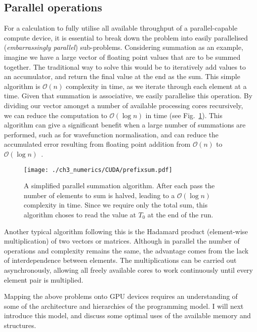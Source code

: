 \subsection{Parallel operations}\label{subsec:par_op}
\label{sub:Parallel operations}
For a calculation to fully utilise all available throughput of a parallel-capable
compute device, it is essential to break down the problem into easily parallelised (\textit{embarrassingly parallel}) sub-problems. Considering summation as an example, imagine we have a large vector of floating point values that are to be summed together. The traditional way to solve this would be to iteratively add values to an accumulator, and return the final value at the end as the sum. This simple algorithm is $\mathcal{O}(n)$ complexity in time, as we iterate through each element at a time. Given that summation is associative, we easily parallelise this operation. By dividing our vector amongst a number of available processing cores recursively, we can reduce the computation to $\mathcal{O}(\log{} n)$ in time (see Fig.~\ref{fig:prefixsum}). This algorithm can give a significant benefit when a large number of summations are performed, such as for wavefunction normalisation, and can reduce the accumulated error resulting from floating point addition from $\mathcal{O}(n)$ to $\mathcal{O}(\log{} n)$~\cite{NUM:Higham_siam_1993}.

\begin{figure}
    \centering
    \texttt{[image: ./ch3\_numerics/CUDA/prefixsum.pdf]}
    \caption{A simplified parallel summation algorithm. After each pass the number of elements to sum is halved, leading to a $\mathcal{O}(\log{} n)$ complexity in time. Since we require only the total sum, this algorithm choses to read the value at $T_0$ at the end of the run.}
    \label{fig:prefixsum}
\end{figure}

Another typical algorithm following this is the Hadamard product (element-wise multiplication) of two vectors or matrices. Although in parallel the number of operations and complexity remains the same, the advantage comes from the lack of interdependence between elements. The multiplications can be carried out asynchronously, allowing all freely available cores to work continuously until every element pair is multiplied.


Mapping the above problems onto GPU devices requires an understanding of some of the architecture and hierarchies of the programming model. I will next introduce this model, and discuss some optimal uses of the available memory and structures.


